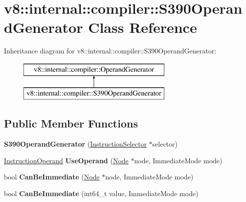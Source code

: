 \hypertarget{classv8_1_1internal_1_1compiler_1_1_s390_operand_generator}{}\section{v8\+:\+:internal\+:\+:compiler\+:\+:S390\+Operand\+Generator Class Reference}
\label{classv8_1_1internal_1_1compiler_1_1_s390_operand_generator}
Inheritance diagram for v8\+:\+:internal\+:\+:compiler\+:\+:S390\+Operand\+Generator\+:\begin{figure}[H]
\begin{center}
\leavevmode
\includegraphics[height=2.000000cm]{classv8_1_1internal_1_1compiler_1_1_s390_operand_generator}
\end{center}
\end{figure}
\subsection*{Public Member Functions}
\begin{DoxyCompactItemize}
\item 
{\bfseries S390\+Operand\+Generator} (\hyperlink{classv8_1_1internal_1_1compiler_1_1_instruction_selector}{Instruction\+Selector} $\ast$selector)\hypertarget{classv8_1_1internal_1_1compiler_1_1_s390_operand_generator_ab81fc70b6c4c9a20c26349ba3c5642c6}{}\label{classv8_1_1internal_1_1compiler_1_1_s390_operand_generator_ab81fc70b6c4c9a20c26349ba3c5642c6}

\item 
\hyperlink{classv8_1_1internal_1_1compiler_1_1_instruction_operand}{Instruction\+Operand} {\bfseries Use\+Operand} (\hyperlink{classv8_1_1internal_1_1compiler_1_1_node}{Node} $\ast$node, Immediate\+Mode mode)\hypertarget{classv8_1_1internal_1_1compiler_1_1_s390_operand_generator_a0a394e42343c9604ee52c6af4cd3c73c}{}\label{classv8_1_1internal_1_1compiler_1_1_s390_operand_generator_a0a394e42343c9604ee52c6af4cd3c73c}

\item 
bool {\bfseries Can\+Be\+Immediate} (\hyperlink{classv8_1_1internal_1_1compiler_1_1_node}{Node} $\ast$node, Immediate\+Mode mode)\hypertarget{classv8_1_1internal_1_1compiler_1_1_s390_operand_generator_a3e484dc49d279a53a3e0f54e676cec49}{}\label{classv8_1_1internal_1_1compiler_1_1_s390_operand_generator_a3e484dc49d279a53a3e0f54e676cec49}

\item 
bool {\bfseries Can\+Be\+Immediate} (int64\+\_\+t value, Immediate\+Mode mode)\hypertarget{classv8_1_1internal_1_1compiler_1_1_s390_operand_generator_aea3dd9283ed3ab48798fdc40a9ae21f3}{}\label{classv8_1_1internal_1_1compiler_1_1_s390_operand_generator_aea3dd9283ed3ab48798fdc40a9ae21f3}

\end{DoxyCompactItemize}
